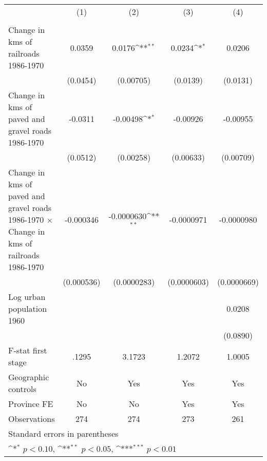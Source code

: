 {
\def\sym#1{\ifmmode^{#1}\else\(^{#1}\)\fi}
\begin{tabular}{l*{4}{c}}
\hline\hline
                &\multicolumn{1}{c}{(1)}&\multicolumn{1}{c}{(2)}&\multicolumn{1}{c}{(3)}&\multicolumn{1}{c}{(4)}\\
                &\multicolumn{1}{c}{}&\multicolumn{1}{c}{}&\multicolumn{1}{c}{}&\multicolumn{1}{c}{}\\
\hline
Change in kms of railroads 1986-1970&   0.0359         &   0.0176\sym{**} &   0.0234\sym{*}  &   0.0206         \\
                & (0.0454)         &(0.00705)         & (0.0139)         & (0.0131)         \\
[1em]
Change in kms of paved and gravel roads 1986-1970&  -0.0311         & -0.00498\sym{*}  & -0.00926         & -0.00955         \\
                & (0.0512)         &(0.00258)         &(0.00633)         &(0.00709)         \\
[1em]
Change in kms of paved and gravel roads 1986-1970 $\times$ Change in kms of railroads 1986-1970&-0.000346         &-0.0000630\sym{**} &-0.0000971         &-0.0000980         \\
                &(0.000536)         &(0.0000283)         &(0.0000603)         &(0.0000669)         \\
[1em]
Log urban population 1960&                  &                  &                  &   0.0208         \\
                &                  &                  &                  & (0.0890)         \\
\hline
F-stat first stage&    .1295         &   3.1723         &   1.2072         &   1.0005         \\
Geographic controls&       No         &      Yes         &      Yes         &      Yes         \\
Province FE     &       No         &       No         &      Yes         &      Yes         \\
Observations    &      274         &      274         &      273         &      261         \\
\hline\hline
\multicolumn{5}{l}{\footnotesize Standard errors in parentheses}\\
\multicolumn{5}{l}{\footnotesize \sym{*} \(p<0.10\), \sym{**} \(p<0.05\), \sym{***} \(p<0.01\)}\\
\end{tabular}
}
